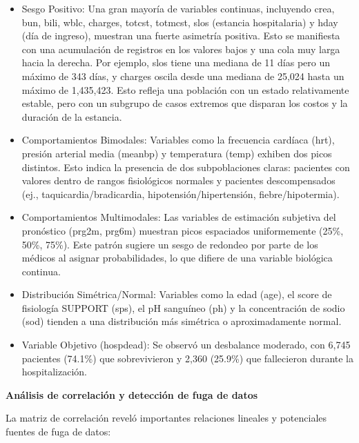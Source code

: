 \begin{itemize}
  \item Sesgo Positivo: Una gran mayoría de variables continuas, incluyendo
    crea, bun, bili, wblc, charges, totcst, totmcst, slos (estancia
    hospitalaria) y hday (día de ingreso), muestran una fuerte asimetría
    positiva. Esto se manifiesta con una acumulación de registros en los valores
    bajos y una cola muy larga hacia la derecha. Por ejemplo, slos tiene una
    mediana de 11 días pero un máximo de 343 días, y charges oscila desde una
    mediana de 25,024 hasta un máximo de 1,435,423. Esto refleja una
    población con un estado relativamente estable, pero con un subgrupo de
    casos extremos que disparan los costos y la duración de la estancia.
  \item Comportamientos Bimodales: Variables como la frecuencia cardíaca (hrt),
    presión arterial media (meanbp) y temperatura (temp) exhiben dos picos
    distintos. Esto indica la presencia de dos subpoblaciones claras: pacientes
    con valores dentro de rangos fisiológicos normales y pacientes
    descompensados (ej., taquicardia/bradicardia, hipotensión/hipertensión,
    fiebre/hipotermia).
  \item Comportamientos Multimodales: Las variables de estimación subjetiva del
    pronóstico (prg2m, prg6m) muestran picos espaciados uniformemente
    (25\%, 50\%, 75\%). Este patrón sugiere un sesgo de redondeo por parte de los
    médicos al asignar probabilidades, lo que difiere de una variable biológica
    continua.
  \item Distribución Simétrica/Normal: Variables como la edad (age), el score de
    fisiología SUPPORT (sps), el pH sanguíneo (ph) y la concentración de sodio
    (sod) tienden a una distribución más simétrica o aproximadamente normal.
  \item Variable Objetivo (hospdead): Se observó un desbalance moderado, con 6,745
    pacientes (74.1\%) que sobrevivieron y 2,360 (25.9\%) que fallecieron durante
    la hospitalización.
\end{itemize}

\textbf{Análisis de correlación y detección de fuga de datos}

La matriz de correlación reveló importantes relaciones lineales y potenciales
fuentes de fuga de datos:

